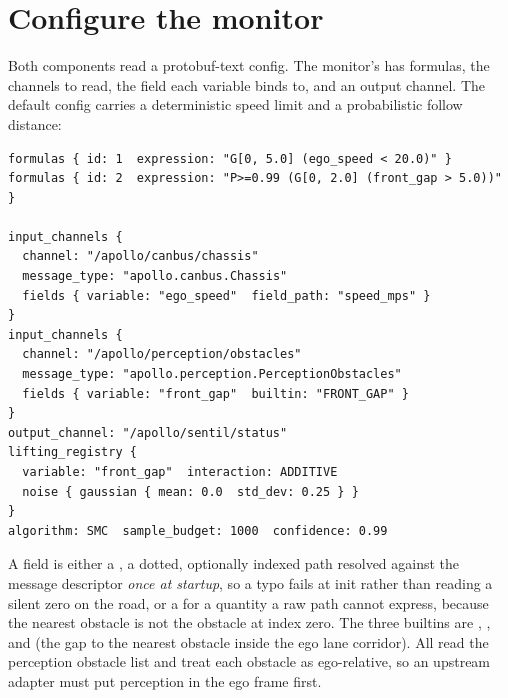 \section{Configure the monitor}

Both components read a protobuf-text config. The monitor's has formulas, the channels to read, the field each variable binds to, and an output channel. The default config carries a deterministic speed limit and a probabilistic follow distance:

\begin{lstlisting}
formulas { id: 1  expression: "G[0, 5.0] (ego_speed < 20.0)" }
formulas { id: 2  expression: "P>=0.99 (G[0, 2.0] (front_gap > 5.0))" }

input_channels {
  channel: "/apollo/canbus/chassis"
  message_type: "apollo.canbus.Chassis"
  fields { variable: "ego_speed"  field_path: "speed_mps" }
}
input_channels {
  channel: "/apollo/perception/obstacles"
  message_type: "apollo.perception.PerceptionObstacles"
  fields { variable: "front_gap"  builtin: "FRONT_GAP" }
}
output_channel: "/apollo/sentil/status"
lifting_registry {
  variable: "front_gap"  interaction: ADDITIVE
  noise { gaussian { mean: 0.0  std_dev: 0.25 } }
}
algorithm: SMC  sample_budget: 1000  confidence: 0.99
\end{lstlisting}

A field is either a , a dotted, optionally indexed path resolved against the message descriptor \emph{once at startup}, so a typo fails at init rather than reading a silent zero on the road, or a  for a quantity a raw path cannot express, because the nearest obstacle is not the obstacle at index zero. The three builtins are , , and  (the gap to the nearest obstacle inside the ego lane corridor). All read the perception obstacle list and treat each obstacle as ego-relative, so an upstream adapter must put perception in the ego frame first.

